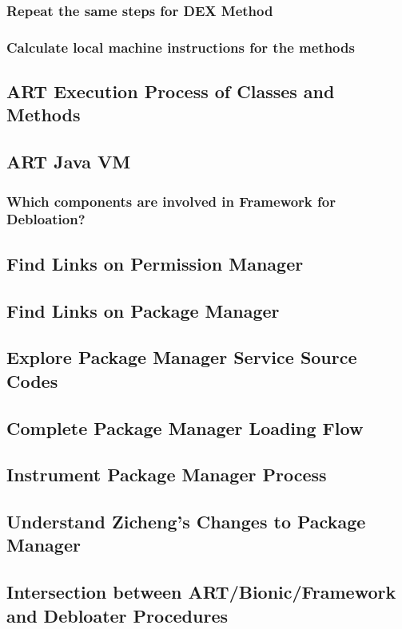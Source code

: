 \subsubsection{Repeat the same steps for DEX Method}

\subsubsection{Calculate local machine instructions for the methods}

\subsection{ART Execution Process of Classes and Methods}

\subsection{ART Java VM}

\subsubsection{Which components are involved in Framework for Debloation?}
\subsection{Find Links on Permission Manager}
\subsection{Find Links on Package Manager}
\subsection{Explore Package Manager Service Source Codes}
\subsection{Complete Package Manager Loading Flow}
\subsection{Instrument Package Manager Process}
\subsection{Understand Zicheng's Changes to Package Manager}

\subsection{Intersection between ART/Bionic/Framework and Debloater Procedures}

